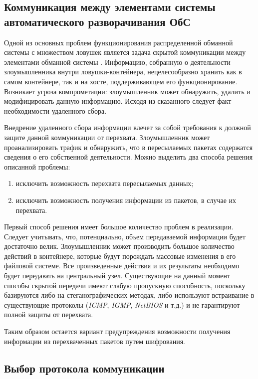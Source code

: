 \subsection{Коммуникация между элементами системы автоматического разворачивания ОбС}

Одной из основных проблем функционирования распределенной обманной системы с множеством ловушек является задача скрытой коммуникации между элементами обманной системы \citep{Peskova2014}. Информацию, собранную о деятельности злоумышленника внутри ловушки-контейнера, нецелесообразно хранить как в самом контейнере, так и на хосте, поддерживающем его функционирование. Возникает угроза компрометации: злоумышленник может обнаружить, удалить и модифицировать данную информацию. Исходя из сказанного следует факт необходимости удаленного сбора. 

Внедрение удаленного сбора информации влечет за собой требования к должной защите данной коммуникации от перехвата. Злоумышленник может проанализировать трафик и обнаружить, что в пересылаемых пакетах содержатся сведения о его собственной деятельности. Можно выделить два способа решения описанной проблемы:
\begin{enumerate}
	\item исключить возможность перехвата пересылаемых данных;
	\item исключить возможность получения информации из пакетов, в случае их перехвата.
\end{enumerate}

Первый способ решения имеет большое количество проблем в реализации. Следует учитывать, что, потенциально, объем передаваемой информации будет достаточно велик. Злоумышленник может производить большое количество действий в контейнере, которые будут порождать массовые изменения в его файловой системе. Все произведенные действия и их результаты необходимо будет передавать на центральный узел. Существующие на данный момент способы скрытой передачи имеют слабую пропускную способность, поскольку базируются либо на стеганографических методах, либо используют встраивание в существующие протоколы (\textit{ICMP}, \textit{IGMP}, \textit{NetBIOS} и т.д.) и не гарантируют полной защиты от перехвата.

Таким образом остается вариант предупреждения возможности получения информации из перехваченных пакетов путем шифрования.

\subsection{Выбор протокола коммуникации}

